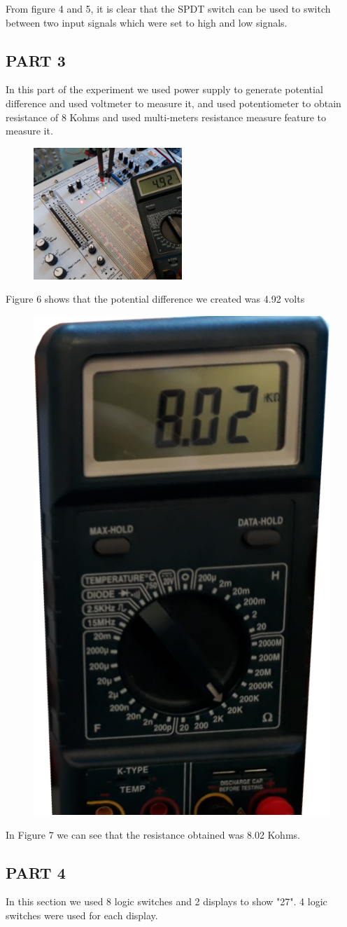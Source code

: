 \documentclass[pdftex,12pt,a4paper]{article}
\begin{document}
From figure 4 and 5, it is clear that the SPDT switch can be used to switch between two input signals which were set to high and low signals.

\clearpage
\subsection{PART 3}
In this part of the experiment we used power supply to generate potential difference and used voltmeter to measure it, and used potentiometer to obtain resistance of 8 Kohms and used multi-meters resistance measure feature to measure it.

\begin{figure}[h]
	\centering
	\includegraphics[width=0.5\textwidth]{6.jpg}
	\caption
	\label{Figure 6}
\end{figure}

Figure 6 shows that the potential difference we created was 4.92 volts

\begin{figure}[h]
	\centering
	\includegraphics[height=0.5\textwidth]{7.jpg}
	\caption
	\label{Figure 7}
\end{figure}

In Figure 7 we can see that the resistance obtained was 8.02 Kohms.

\clearpage
\subsection{PART 4}
In this section we used 8 logic switches and 2 displays to show "27". 4 logic switches were used for each display.
\end{document}
